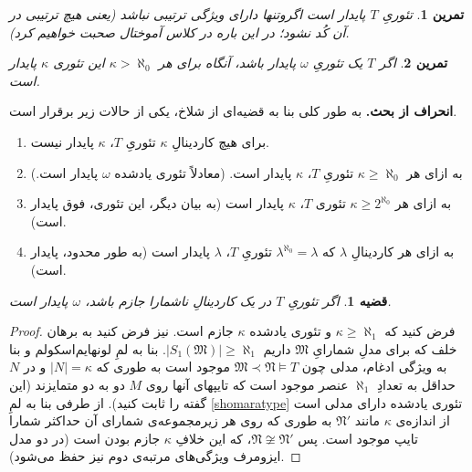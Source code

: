 \documentclass[12pt,a4paper]{report}
\theoremstyle{colorhead}
\newtheorem{thm}{قضیه}
\newtheorem{tam}{تمرین}
\begin{document}
\begin{tam}
تئوریِ
$T$
پایدار است اگروتنها دارای ویژگی ترتیبی نباشد (یعنی هیچ ترتیبی در آن کُد نشود؛ در این باره در کلاس آموختال صحبت خواهیم کرد).
\end{tam}
\begin{tam}
اگر
$T$
یک تئوریِ
$\omega$
پایدار باشد، آنگاه برای هر
$\kappa>\aleph_0$
این تئوری
$\kappa$
پایدار است. 
\end{tam}
\begin{framed}
\textbf{انحراف از بحث.}
به طور کلی بنا به قضیه‌ای از شلاخ، یکی از حالات زیر برقرار است. 
\begin{enumerate}
\item
برای هیچ کاردینالِ
$\kappa$
تئوریِ
$T$،
$\kappa$
پایدار نیست.
\item 
به ازای هر 
$\kappa\geq \aleph_0$
تئوریِ
$T$،
$\kappa$
پایدار است.
(معادلاً تئوری یادشده 
$\omega$
پایدار است.)
\item 
به ازای هر
$\kappa\geq 2^{\aleph_0}$
تئوری
$T$،
$\kappa$
پایدار است (به بیان دیگر، این تئوری،
فوق پایدار است).
\item 
به ازای هر کاردینالِ
$\lambda$
که
$\lambda^{\aleph_0}=\lambda$
تئوریِ
$T$،
$\lambda$
پایدار است (به طور محدود، پایدار است).
\end{enumerate}
\end{framed}
\begin{thm}
اگر تئوریِ
$T$
در یک کاردینالِ ناشمارا جازم باشد،‌
$\omega$
پایدار است. 
\end{thm}
\begin{proof}
فرض کنید که
$\kappa\geq \aleph_1$
و تئوری یادشده
$\kappa$
جازم است. نیز فرض کنید به برهان خلف که برای مدلِ شمارایِ
$\mathfrak{M}$
داریم
$|S_1(\mathfrak{M})|\geq \aleph_1$.
بنا به لمِ لونهایم‌اسکولم  و بنا به ویژگی ادغام،‌ مدلی چون
$\mathfrak{M}\prec \mathfrak{N}\models T$
موجود است به طوری که
$|N|=\kappa$
و در
$N$
حداقل به تعدادِ
$\aleph_1$
عنصر موجود است که تایپهای آنها روی 
$M$
دو به دو متمایزند
 (این گفته را ثابت کنید). 
 از طرفی بنا به لمِ
 \ref{shomaratype}
 تئوری یادشده دارای مدلی است از اندازه‌ی
 $\kappa$
 مانند
 $\mathfrak{N}'$
 به طوری که روی هر زیرمجموعه‌ی شمارای آن 
 حداکثر شمارا تایپ موجود است. پس
 $\mathfrak{N}\not\cong \mathfrak{N}'$،
 که این خلافِ
 $\kappa$
 جازم بودن است (در دو مدل ایزومرف ویژگی‌های مرتبه‌ی دوم نیز حفظ می‌شود).
 \end{proof}
\end{document}

